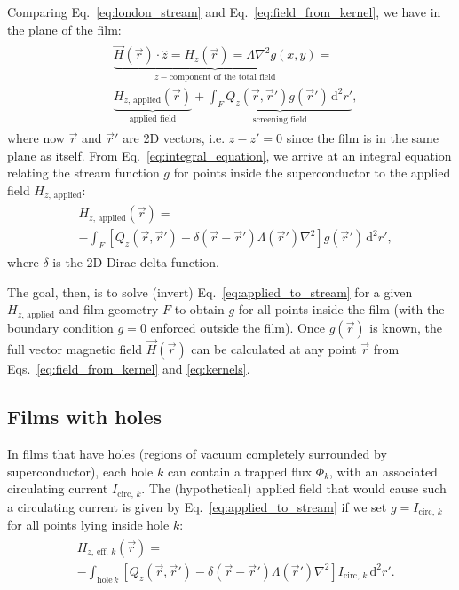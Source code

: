 \documentclass[final,3p,times,twocolumn]{elsarticle}
\newcounter{bla}
\begin{document}
Comparing Eq.~\ref{eq:london_stream} and Eq.~\ref{eq:field_from_kernel}, we have in the plane of the film:
\begin{align}
    \label{eq:integral_equation}
    \begin{split}
        &\underbrace{\vec{H}(\vec{r})\cdot\hat{z} = H_z(\vec{r})
        = \Lambda\nabla^2g(x, y)}_{z-\text{component of the total field}}
        = \\ & \underbrace{H_{z,\,\mathrm{applied}}(\vec{r})}_{\text{applied field}}
        + \underbrace{\int_F Q_z(\vec{r},\vec{r}')g(\vec{r}')\,\mathrm{d}^2r'}_{\text{screening field}},
    \end{split}
\end{align}
where now $\vec{r}$ and $\vec{r}'$ are 2D vectors, i.e. $z-z'=0$ since the film is in the same plane as itself. From Eq.~\ref{eq:integral_equation}, we arrive at an integral equation relating the stream function $g$ for points inside the superconductor to the applied field $H_{z,\,\mathrm{applied}}$:
\begin{align}
\begin{split}
    \label{eq:applied_to_stream}
    &H_{z,\,\mathrm{applied}}(\vec{r})
    = \\ &-\int_F\left[
        Q_z(\vec{r},\vec{r}')-\delta(\vec{r}-\vec{r}')\Lambda(\vec{r}')\nabla^2\right
    ]g(\vec{r}')\,\mathrm{d}^2r',
\end{split}
\end{align}
where $\delta$ is the 2D Dirac delta function.

The goal, then, is to solve (invert) Eq.~\ref{eq:applied_to_stream} for a given $H_{z,\,\mathrm{applied}}$ and film geometry $F$ to obtain $g$ for all points inside the film (with the boundary condition $g=0$ enforced outside the film). Once $g(\vec{r})$ is known, the full vector magnetic field $\vec{H}(\vec{r})$ can be calculated at any point $\vec{r}$
from Eqs.~\ref{eq:field_from_kernel} and \ref{eq:kernels}.

\subsection{Films with holes}
\label{section:model:holes}

In films that have holes (regions of vacuum completely surrounded by superconductor), each hole $k$ can contain a trapped flux $\Phi_k$, with an associated circulating current $I_{\mathrm{circ},\,k}$. The (hypothetical) applied field that would cause such a circulating current is given by Eq.~\ref{eq:applied_to_stream} if we set $g=I_{\mathrm{circ},\,k}$ for all points lying inside hole $k$:
\begin{align}
\begin{split}
    \label{eq:Heff}
    &H_{z,\,\mathrm{eff},\,k}(\vec{r}) = \\
    &-\int_{\mathrm{hole}\,k}[
        Q_z(\vec{r},\vec{r}')-\delta(\vec{r}-\vec{r}')\Lambda(\vec{r}')\nabla^2
    ] I_{\mathrm{circ},\,k} \,\mathrm{d}^2r'.   
\end{split}
\end{align}
\end{document}
